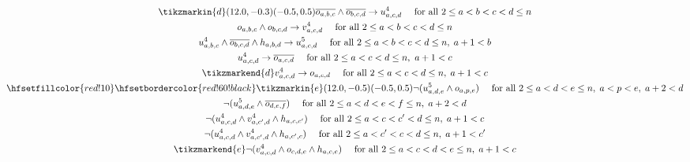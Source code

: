 \begin{figure}
\begin{spreadlines}{16pt}
\begin{gather}
\tikzmarkin{d}(12.0,-0.3)(-0.5,0.5)
  \ov{\orvar_{a,b,c}} \land \ov{\orvar_{b,c,d}} \rightarrow \uvar_{a, c, d} \quad \text{ for all } 2 \leq a < b < c < d \leq n\label{eq:capDef}\\
  \orvar_{a, b, c} \land \orvar_{b, c, d} \rightarrow \vvar_{a, c, d} \quad \text{ for all } 2 \leq a < b < c < d \leq n \label{eq:cupDef}\\
  \uvar_{a,b,c} \land \ov{\orvar_{b,c,d}} \land \hvar_{a,b,d} \rightarrow \ufvar_{a, c, d} \quad \text{ for all } 2 \leq a < b < c < d \leq n,\; a+1<b\label{eq:capFDef}\\
  \uvar_{a, c, d} \rightarrow \ov{\orvar_{a,c,d}} \quad \text{ for all } 2 \leq a < c < d \leq n,\ a+1<c\label{eq:capDef2}\\
  \tikzmarkend{d}\vvar_{a, c, d} \rightarrow \orvar_{a,c,d} \quad \text{ for all } 2 \leq a < c < d \leq n,\; a+1<c\label{eq:cupDef2}\\
%
\hfsetfillcolor{red!10}
\hfsetbordercolor{red!60!black}
\tikzmarkin{e}(12.0,-0.5)(-0.5,0.5)
  \neg(\ufvar_{a,d,e} \land \orvar_{a, p, e}) \quad \text { for all } 2 \leq a < d < e \leq n, \; a < p < e, \; a+2 < d\label{eq:no6Hole1Below}\\
  \neg(\ufvar_{a,d,e} \land \ov{\orvar_{d, e, f}}) \quad \text { for all } 2 \leq a < d < e < f\leq n, \; a+2 < d\label{eq:no6Hole4Above}\\
  \neg(\uvar_{a,c,d} \land \vvar_{a, c', d} \land \hvar_{a,c,c'}) \quad \text{ for all } 2 \leq a < c < c' < d \leq n, \; a+1 < c\label{eq:no6Hole2Below1}\\
  \neg(\uvar_{a,c,d} \land \vvar_{a, c', d} \land \hvar_{a,c',c}) \quad \text{ for all } 2 \leq a < c' < c < d \leq n, \; a+1 < c'\label{eq:no6Hole2Below2}\\
  \tikzmarkend{e}\neg(\vvar_{a,c,d} \land \orvar_{c, d, e} \land \hvar_{a,c,e}) \quad \text{ for all } 2 \leq a < c < d < e \leq n, \; a+1 < c\label{eq:no6Hole3Below}
  \end{gather}
\end{spreadlines}
\end{figure}
